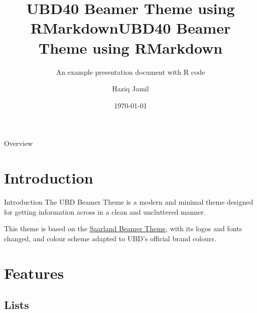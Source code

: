\documentclass[,aspectratio=43]{beamer}
\author{Haziq Jamil}
\title{UBD40 Beamer Theme using RMarkdown}
\title{UBD40 Beamer Theme using RMarkdown}
\subtitle{An example presentation document with R code}
\institute{Mathematical Sciences, Faculty of Science, UBD\\
\url{https://haziqj.ml}}
\date{\today}
\begin{document}
\begin{frame}
	\titlepage
\end{frame}

\begin{frame}{Overview}
    \tableofcontents
  \end{frame}

\section{Introduction}\label{introduction}

\begin{frame}{Introduction}
The UBD Beamer Theme is a modern and minimal theme designed for getting
information across in a clean and uncluttered manner. \bigskip

This theme is based on the
\href{https://github.com/kailashbuki/beamerthemesaarland}{Saarland
Beamer Theme}, with its logos and fonts changed, and colour scheme
adapted to UBD's official brand colours.
\end{frame}

\section{Features}\label{features}

\subsection{Lists}\label{lists}
\end{document}
